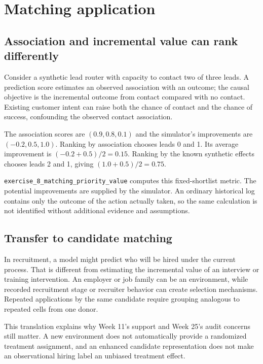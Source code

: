 \documentclass[11pt,oneside]{scrbook}
\begin{document}
\chapter{Matching application}
\begin{matching}
\section{Association and incremental value can rank differently}
Consider a synthetic lead router with capacity to contact two of three leads. A prediction
score estimates an observed association with an outcome; the causal objective is the
incremental outcome from contact compared with no contact. Existing customer intent
can raise both the chance of contact and the chance of success, confounding the observed
contact association.

The association scores are $(0.9,0.8,0.1)$ and the simulator's improvements are
$(-0.2,0.5,1.0)$. Ranking by association chooses leads 0 and 1. Its average improvement
is $(-0.2+0.5)/2=0.15$. Ranking by the known synthetic effects chooses leads 2 and 1,
giving $(1.0+0.5)/2=0.75$.

\texttt{exercise\_8\_matching\_priority\_value} computes this fixed-shortlist metric.
The potential improvements are supplied by the simulator. An ordinary historical log
contains only the outcome of the action actually taken, so the same calculation is not
identified without additional evidence and assumptions.
\end{matching}

\section{Transfer to candidate matching}
In recruitment, a model might predict who will be hired under the current process.
That is different from estimating the incremental value of an interview or training
intervention. An employer or job family can be an environment, while recorded recruitment
stage or recruiter behavior can create selection mechanisms. Repeated applications by
the same candidate require grouping analogous to repeated cells from one donor.

This translation explains why Week 11's support and Week 25's audit concerns still matter.
A new environment does not automatically provide a randomized treatment assignment,
and an enhanced candidate representation does not make an observational hiring label
an unbiased treatment effect.
\end{document}
